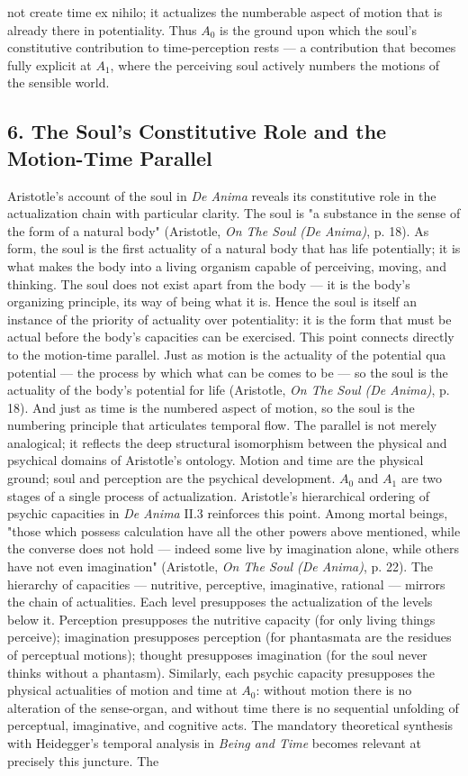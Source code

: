 not create time ex nihilo; it actualizes the numberable aspect of motion that is already there in potentiality. Thus $A_0$ is the ground upon which the soul's constitutive contribution to time-perception rests --- a contribution that becomes fully explicit at $A_1$, where the perceiving soul actively numbers the motions of the sensible world. 

\subsection*{6. The Soul's Constitutive Role and the Motion-Time Parallel}

Aristotle's account of the soul in \textit{De Anima} reveals its constitutive role in the actualization chain with particular clarity. The soul is "a substance in the sense of the form of a natural body" (Aristotle, \textit{On The Soul (De Anima)}, p. 18). As form, the soul is the first actuality of a natural body that has life potentially; it is what makes the body into a living organism capable of perceiving, moving, and thinking. The soul does not exist apart from the body --- it is the body's organizing principle, its way of being what it is. Hence the soul is itself an instance of the priority of actuality over potentiality: it is the form that must be actual before the body's capacities can be exercised. This point connects directly to the motion-time parallel. Just as motion is the actuality of the potential qua potential --- the process by which what can be comes to be --- so the soul is the actuality of the body's potential for life (Aristotle, \textit{On The Soul (De Anima)}, p. 18). And just as time is the numbered aspect of motion, so the soul is the numbering principle that articulates temporal flow. The parallel is not merely analogical; it reflects the deep structural isomorphism between the physical and psychical domains of Aristotle's ontology. Motion and time are the physical ground; soul and perception are the psychical development. $A_0$ and $A_1$ are two stages of a single process of actualization. Aristotle's hierarchical ordering of psychic capacities in \textit{De Anima} II.3 reinforces this point. Among mortal beings, "those which possess calculation have all the other powers above mentioned, while the converse does not hold --- indeed some live by imagination alone, while others have not even imagination" (Aristotle, \textit{On The Soul (De Anima)}, p. 22). The hierarchy of capacities --- nutritive, perceptive, imaginative, rational --- mirrors the chain of actualities. Each level presupposes the actualization of the levels below it. Perception presupposes the nutritive capacity (for only living things perceive); imagination presupposes perception (for phantasmata are the residues of perceptual motions); thought presupposes imagination (for the soul never thinks without a phantasm). Similarly, each psychic capacity presupposes the physical actualities of motion and time at $A_0$: without motion there is no alteration of the sense-organ, and without time there is no sequential unfolding of perceptual, imaginative, and cognitive acts. The mandatory theoretical synthesis with Heidegger's temporal analysis in \textit{Being and Time} becomes relevant at precisely this juncture. The  